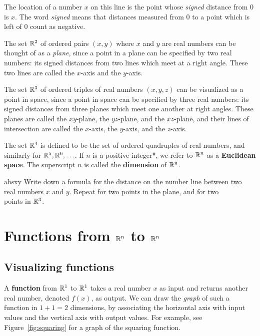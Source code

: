 \documentclass[svgnames]{watsonbook}
\begin{document}
The location of a number $x$ on this line is the point whose
\textit{signed} distance from 0 is $x$. The word \textit{signed} means
that distances measured from 0 to a point which is left of 0 count as
negative.

The set $\mathbb{R}^2$ of ordered pairs $(x,y)$ where $x$ and $y$ are real
numbers can be thought of as a \textit{plane}, since a point in a
plane can be specified by two real numbers: its signed distances from
two lines which meet at a right angle. These two lines are called the
$x$-axis and the $y$-axis.

The set $\mathbb{R}^3$ of ordered triples of real numbers $(x,y,z)$ can be
visualized as a point in space, since a point in space can be
specified by three real numbers: its signed distances from three
planes which meet one another at right angles. These planes are called
the $xy$-plane, the $yz$-plane, and the $xz$-plane, and their lines of
intersection are called the $x$-axis, the $y$-axis, and the $z$-axis. 

The set $\mathbb{R}^4$ is defined to be the set of ordered quadruples of real
numbers, and similarly for $\mathbb{R}^5, \mathbb{R}^6, \ldots$.  
 If
$n$ is a positive integer*, we refer to $\mathbb{R}^n$ as a \textbf{Euclidean
  space}. The superscript $n$
is called the \textbf{dimension} of $\mathbb{R}^n$. 

\begin{exercise}{}{absxy}
  Write down a formula for the distance on the number line between two \\
  real numbers $x$ and $y$. Repeat for two points in the plane, and
  for two \\ points in $\mathbb{R}^3$. 
\end{exercise}

\section{Functions from $\mathbb{R}^n$ to $\mathbb{R}^n$} \label{sec:RntoRn}

\subsection{Visualizing functions}

A \textbf{function} from $\mathbb{R}^1$ to $\mathbb{R}^1$ takes a real number $x$ as
input and returns another real number, denoted $f(x)$, as output. We
can draw the \textit{graph} of such a function in $1 + 1 = 2$
dimensions, by associating the horizontal axis with input values and
the vertical axis with output values. For example, see
Figure~\ref{fig:squaring} for a graph of the squaring function.
\end{document}
